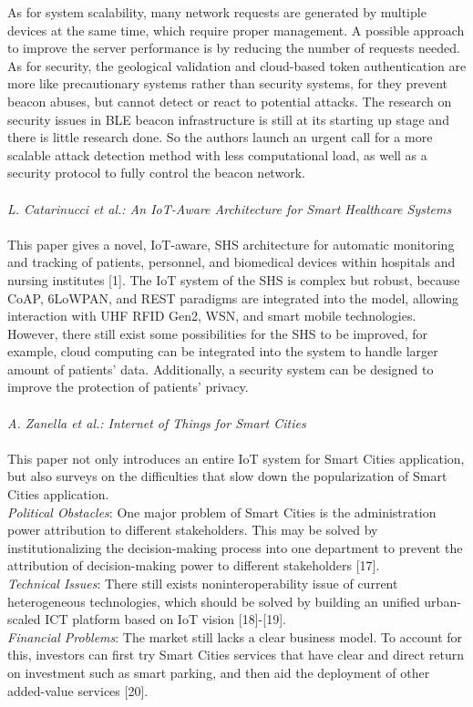 \documentclass[conference]{IEEEtran}
\begin{document}
\text{\quad} As for system scalability, many network requests are generated by multiple devices at the same time, which require proper management. A possible approach to improve the server performance is by reducing the number of requests needed.\\
\text{\quad} As for security, the geological validation and cloud-based token authentication are more like precautionary systems rather than security systems, for they prevent beacon abuses, but cannot detect or react to potential attacks. The research on security issues in BLE beacon infrastructure is still at its starting up stage and there is little research done. So the authors launch an urgent call for a more scalable attack detection method with less computational load, as well as a security protocol to fully control the beacon network. \\
\\
\textit{L. Catarinucci et al.: An IoT-Aware Architecture for Smart Healthcare Systems}
\\
\\
\text{\quad} This paper gives a novel, IoT-aware, SHS architecture for
automatic monitoring and tracking of patients, personnel, and
biomedical devices within hospitals and nursing institutes [1]. The IoT system of the SHS is complex but robust, because CoAP, 6LoWPAN, and REST paradigms are integrated into the model, allowing interaction with UHF RFID Gen2, WSN, and smart mobile
technologies. \\
\text{\quad} However, there still exist some possibilities for the SHS to be improved, for example, cloud computing can be integrated into the system to handle larger amount of patients' data. Additionally, a security system can be designed to improve the protection of patients' privacy.
\\
\\
\textit{A. Zanella et al.: Internet of Things for Smart Cities}
\\
\\
\text{\quad} This paper not only introduces an entire IoT system for Smart Cities application, but also surveys on the difficulties that slow down the popularization of Smart Cities application. \\ 
\text{\quad} \textit{Political Obstacles}: One major problem of Smart Cities is the administration power attribution to different stakeholders. This may be solved by institutionalizing the decision-making process into one department to prevent the attribution of decision-making power to different stakeholders [17]. \\
\text{\quad} \textit{Technical Issues}: There still exists noninteroperability issue of current heterogeneous technologies, which should be solved by building an unified urban-scaled ICT platform based on IoT vision [18]-[19].\\
\text{\quad} \textit{Financial Problems}: The market still lacks a clear business model. To account for this, investors can first try Smart Cities services that have clear and direct return on investment such as smart parking, and then aid the deployment of other added-value services [20].
\\
\end{document}
